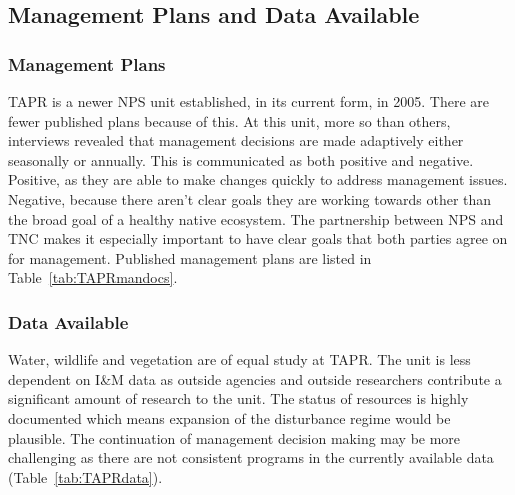 \subsection{Management Plans and Data Available}

\subsubsection{Management Plans}

TAPR is a newer NPS unit established, in its current form, in 2005.
There are fewer published plans because of this. 
At this unit, more so than others, interviews revealed that management decisions are made adaptively either seasonally or annually. 
This is communicated as both positive and negative. 
Positive, as they are able to make changes quickly to address management issues. 
Negative, because there aren't clear goals they are working towards other than the broad goal of a healthy native ecosystem. 
The partnership between NPS and TNC makes it especially important to have clear goals that both parties agree on for management. 
Published management plans are listed in Table~\ref{tab:TAPRmandocs}.

\subsubsection{Data Available}

Water, wildlife and vegetation are of equal study at TAPR. 
The unit is less dependent on I\&M data as outside agencies and outside researchers contribute a significant amount of research to the unit. 
The status of resources is highly documented which means expansion of the disturbance regime would be plausible. 
The continuation of management decision making may be more challenging as there are not consistent programs in the currently available data (Table~\ref{tab:TAPRdata}).

